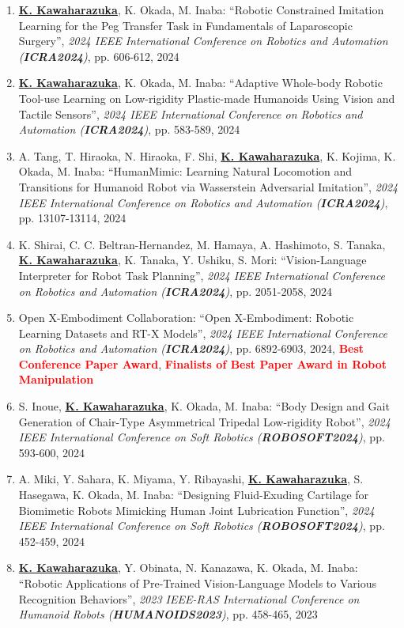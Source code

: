 \documentclass[letterpaper]{article}
\begin{document}
\begin{enumerate}
\item \underline{\textbf{K. Kawaharazuka}}, K. Okada, M. Inaba: ``Robotic Constrained Imitation Learning for the Peg Transfer Task in Fundamentals of Laparoscopic Surgery'', \textit{2024 IEEE International Conference on Robotics and Automation (\textit{\textbf{ICRA2024}})}, pp. 606-612, 2024
\item \underline{\textbf{K. Kawaharazuka}}, K. Okada, M. Inaba: ``Adaptive Whole-body Robotic Tool-use Learning on Low-rigidity Plastic-made Humanoids Using Vision and Tactile Sensors'', \textit{2024 IEEE International Conference on Robotics and Automation (\textit{\textbf{ICRA2024}})}, pp. 583-589, 2024
\item A. Tang, T. Hiraoka, N. Hiraoka, F. Shi, \underline{\textbf{K. Kawaharazuka}}, K. Kojima, K. Okada, M. Inaba: ``HumanMimic: Learning Natural Locomotion and Transitions for Humanoid Robot via Wasserstein Adversarial Imitation'', \textit{2024 IEEE International Conference on Robotics and Automation (\textit{\textbf{ICRA2024}})}, pp. 13107-13114, 2024
\item K. Shirai, C. C. Beltran-Hernandez, M. Hamaya, A. Hashimoto, S. Tanaka, \underline{\textbf{K. Kawaharazuka}}, K. Tanaka, Y. Ushiku, S. Mori: ``Vision-Language Interpreter for Robot Task Planning'', \textit{2024 IEEE International Conference on Robotics and Automation (\textit{\textbf{ICRA2024}})}, pp. 2051-2058, 2024
\item Open X-Embodiment Collaboration: ``Open X-Embodiment: Robotic Learning Datasets and RT-X Models'', \textit{2024 IEEE International Conference on Robotics and Automation (\textit{\textbf{ICRA2024}})}, pp. 6892-6903, 2024, \textbf{\textcolor{red}{Best Conference Paper Award}}, \textbf{\textcolor{red}{Finalists of Best Paper Award in Robot Manipulation}}
\item S. Inoue, \underline{\textbf{K. Kawaharazuka}}, K. Okada, M. Inaba: ``Body Design and Gait Generation of Chair-Type Asymmetrical Tripedal Low-rigidity Robot'', \textit{2024 IEEE International Conference on Soft Robotics (\textit{\textbf{ROBOSOFT2024}})}, pp. 593-600, 2024
\item A. Miki, Y. Sahara, K. Miyama, Y. Ribayashi, \underline{\textbf{K. Kawaharazuka}}, S. Hasegawa, K. Okada, M. Inaba: ``Designing Fluid-Exuding Cartilage for Biomimetic Robots Mimicking Human Joint Lubrication Function'', \textit{2024 IEEE International Conference on Soft Robotics (\textit{\textbf{ROBOSOFT2024}})}, pp. 452-459, 2024
\item \underline{\textbf{K. Kawaharazuka}}, Y. Obinata, N. Kanazawa, K. Okada, M. Inaba: ``Robotic Applications of Pre-Trained Vision-Language Models to Various Recognition Behaviors'', \textit{2023 IEEE-RAS International Conference on Humanoid Robots (\textit{\textbf{HUMANOIDS2023}})}, pp. 458-465, 2023

\end{enumerate}
\end{document}
